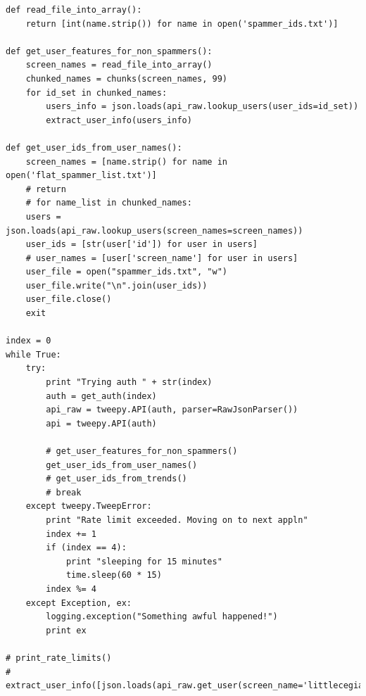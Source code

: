 \documentclass[11pt]{article}
\begin{document}
\begin{lstlisting}
def read_file_into_array():
    return [int(name.strip()) for name in open('spammer_ids.txt')]

def get_user_features_for_non_spammers():
    screen_names = read_file_into_array()
    chunked_names = chunks(screen_names, 99)
    for id_set in chunked_names:
        users_info = json.loads(api_raw.lookup_users(user_ids=id_set))
        extract_user_info(users_info)

def get_user_ids_from_user_names():
    screen_names = [name.strip() for name in open('flat_spammer_list.txt')]
    # return
    # for name_list in chunked_names:
    users = json.loads(api_raw.lookup_users(screen_names=screen_names))
    user_ids = [str(user['id']) for user in users]
    # user_names = [user['screen_name'] for user in users]
    user_file = open("spammer_ids.txt", "w")
    user_file.write("\n".join(user_ids))
    user_file.close()
    exit

index = 0
while True:
    try:
        print "Trying auth " + str(index)
        auth = get_auth(index)
        api_raw = tweepy.API(auth, parser=RawJsonParser())
        api = tweepy.API(auth)

        # get_user_features_for_non_spammers()
        get_user_ids_from_user_names()
        # get_user_ids_from_trends()
        # break
    except tweepy.TweepError:
        print "Rate limit exceeded. Moving on to next appln"
        index += 1
        if (index == 4):
            print "sleeping for 15 minutes"
            time.sleep(60 * 15)
        index %= 4
    except Exception, ex:
        logging.exception("Something awful happened!")
        print ex

# print_rate_limits()
# extract_user_info([json.loads(api_raw.get_user(screen_name='littlecegian07'))])
\end{lstlisting}
\end{document}
